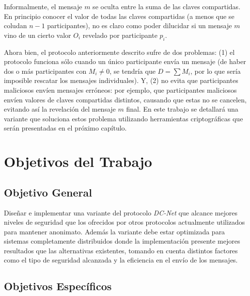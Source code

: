 Informalmente, el mensaje $m$ se oculta entre la suma de las claves 
compartidas. En principio conocer el valor de todas las claves compartidas (a 
menos que se coludan $n-1$ participantes), no es claro como poder dilucidar si 
un mensaje $m$ vino de un cierto valor $O_i$ revelado por participante $p_i$.

Ahora bien, el protocolo anteriormente descrito sufre de dos problemas: (1) el 
protocolo funciona sólo cuando un único participante envía un mensaje (de 
haber dos o más participantes con $M_i \neq 0$, se tendría que $D = \sum M_i$, 
por lo que sería imposible rescatar los mensajes individuales). Y, (2) no 
evita que participantes maliciosos envíen mensajes erróneos: por ejemplo, que 
participantes maliciosos envíen valores de claves compartidas distintos, 
causando que estas no se cancelen, evitando así la revelación del mensaje $m$ 
final. En este trabajo se detallará una variante que soluciona estos problema 
utilizando herramientas criptográficas que serán presentadas en el próximo 
capítulo.

\section{Objetivos del Trabajo}

\subsection{Objetivo General}

Diseñar e implementar una variante del protocolo \emph{DC-Net} que alcance 
mejores niveles de seguridad que los ofrecidos por otros protocolos 
actualmente utilizados para mantener anonimato. Además la variante debe estar 
optimizada para sistemas completamente distribuidos donde la implementación 
presente mejores resultados que las alternativas existentes, tomando en cuenta 
distintos factores como el tipo de seguridad alcanzada y la eficiencia en el 
envío de los mensajes.

\subsection{Objetivos Específicos}

